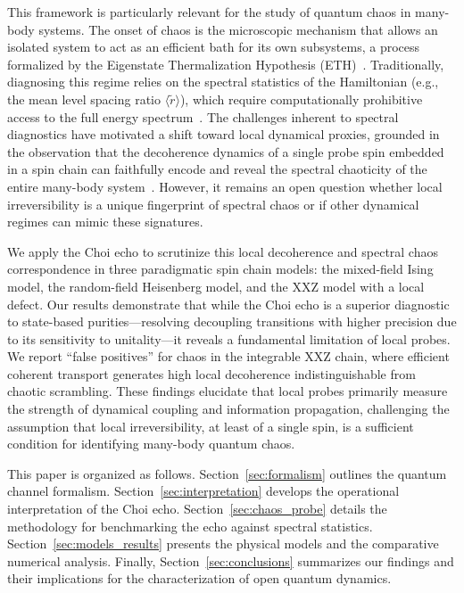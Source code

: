 \documentclass[pra,twocolumn,aps,showpacs,superscriptaddress,longbibliography]{revtex4-2}
\begin{document}
This framework is particularly relevant for the study of quantum chaos in many-body systems. The onset of chaos is the microscopic mechanism that allows an isolated system to act as an efficient bath for its own subsystems, a process formalized by the Eigenstate Thermalization Hypothesis (ETH)~\cite{deutsch_1991_quantum, dalessio_2016_quantum}. Traditionally, diagnosing this regime relies on the spectral statistics of the Hamiltonian (e.g., the mean level spacing ratio $\langle \tilde{r} \rangle$), which require computationally prohibitive access to the full energy spectrum~\cite{bohigas_1984_characterization, scialchi_2024_integrabilitytochaos}. The challenges inherent to spectral diagnostics have motivated a shift toward local dynamical proxies, grounded in the observation that the decoherence dynamics of a single probe spin embedded in a spin chain can faithfully encode and reveal the spectral chaoticity of the entire many-body system~\cite{borgonovi_2025_timescales, mirkin_2021_quantum}.
However, it remains an open question whether local irreversibility is a unique fingerprint of spectral chaos or if other dynamical regimes can mimic these signatures.

We apply the Choi echo to scrutinize this local decoherence and spectral chaos correspondence in three paradigmatic spin chain models: the mixed-field Ising model, the random-field Heisenberg model, and the XXZ model with a local defect. Our results demonstrate that while the Choi echo is a superior diagnostic to state-based purities—resolving decoupling transitions with higher precision due to its sensitivity to unitality—it reveals a fundamental limitation of local probes. We report ``false positives'' for chaos in the integrable XXZ chain, where efficient coherent transport generates high local decoherence indistinguishable from chaotic scrambling. These findings elucidate that local probes primarily measure the strength of dynamical coupling and information propagation, challenging the assumption that local irreversibility, at least of a single spin, is a sufficient condition for identifying many-body quantum chaos.

This paper is organized as follows. Section~\ref{sec:formalism} outlines the quantum channel formalism. Section~\ref{sec:interpretation} develops the operational interpretation of the Choi echo. Section~\ref{sec:chaos_probe} details the methodology for benchmarking the echo against spectral statistics. Section~\ref{sec:models_results} presents the physical models and the comparative numerical analysis. Finally, Section~\ref{sec:conclusions} summarizes our findings and their implications for the characterization of open quantum dynamics.
%
\end{document}
